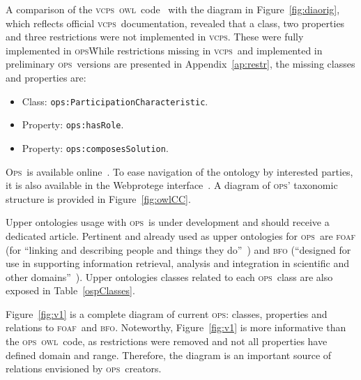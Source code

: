\documentclass[10pt,letterpaper]{article}
\newcommand{\ops}{\textsc{ops}}
\newcommand{\opsi}{O\textsc{ps}}
\newcommand{\vcps}{\textsc{vcps}}
\newcommand{\owl}{\textsc{owl}}
\newcommand{\bfo}{\textsc{bfo}}
\newcommand{\foaf}{\textsc{foaf}}
\begin{document}
A comparison of the \vcps\ \owl\ code~\cite{owlCCPtg} 
with the diagram in Figure~\ref{fig:diaorig}, which reflects official \vcps\ documentation,
revealed that a class, two properties and three restrictions were not implemented in \vcps.
These were fully implemented in \ops\.
While restrictions missing in \vcps\ and implemented in preliminary \ops\ versions are presented in Appendix~\ref{ap:restr},
the missing classes and properties are:
\begin{itemize}
    \item Class: {\tt    ops:ParticipationCharacteristic}.
    \item Property: {\tt ops:hasRole}.
    \item Property: {\tt ops:composesSolution}.
\end{itemize}

\noindent \opsi\ is available online~\cite{owlOSP}.
To ease navigation of the ontology by interested parties,
it is also available in the Webprotege interface~\cite{owlOSPwp}.
A diagram of \ops ' taxonomic structure is provided in Figure~\ref{fig:owlCC}.

Upper ontologies usage with \ops\ is under development and should receive a dedicated article.
Pertinent and already used as upper ontologies for \ops\ are \foaf
(for ``linking and describing people and things they do''~\cite{foaf}) and \bfo
(``designed for use in supporting information retrieval, analysis and integration in scientific and other domains''~\cite{bfo}).
Upper ontologies classes related to each \ops\ class are also exposed in Table~\ref{ospClasses}.

Figure~\ref{fig:v1} is a complete diagram of current \ops:
classes, properties and relations to \foaf\ and \bfo.
Noteworthy, Figure~\ref{fig:v1} is more informative than the \ops\ \owl\ code,
as restrictions were removed and not all properties have defined domain and range.
Therefore, the diagram is an important source of relations envisioned by \ops\ creators.
\end{document}
